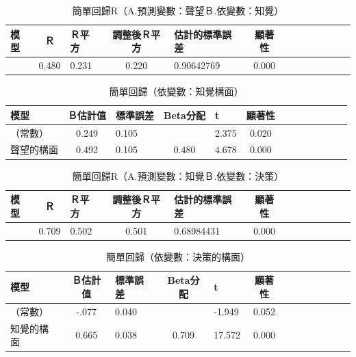 \begin{table}[htb]
\caption{簡單回歸R（A.預測變數：聲望Ｂ.依變數：知覺）}
\label{tab:HR2}
\centering
\renewcommand{\arraystretch}{1.2} %
\arrayrulewidth=1pt               %
\tabcolsep=10pt                   %
\begin{tabular}[t]{lclclclclclcl}  %
\hline
 模型&Ｒ&Ｒ平方&調整後Ｒ平方&估計的標準誤差&顯著性\\
\hline
&0.480&0.231&0.220&0.90642769&0.000\\
\hline
\end{tabular}
\end{table}

\begin{table}[htb]
\caption{簡單回歸（依變數：知覺構面）}
\label{tab:H2}
\centering
\renewcommand{\arraystretch}{1.2} %
\arrayrulewidth=1pt               %
\tabcolsep=10pt                   %
\begin{tabular}[t]{lclclclclclcl}  %
\hline
 模型&Ｂ估計值&標準誤差&Beta分配&t&顯著性\\
\hline
（常數）&0.249&0.105&&2.375&0.020\\
聲望的構面&0.492&0.105&0.480&4.678&0.000\\
\hline
\end{tabular}
\end{table}


\begin{table}[htb]
\caption{簡單回歸R（A.預測變數：知覺Ｂ.依變數：決策）}
\label{tab:HR3}
\centering
\renewcommand{\arraystretch}{1.2} %
\arrayrulewidth=1pt               %
\tabcolsep=10pt                   %
\begin{tabular}[t]{lclclclclclcl}  %
\hline
 模型&Ｒ&Ｒ平方&調整後Ｒ平方&估計的標準誤差&顯著性\\
\hline
&0.709&0.502&0.501&0.68984431&0.000\\
\hline
\end{tabular}
\end{table}


\begin{table}[htb]
\caption{簡單回歸（依變數：決策的構面）}
\label{tab:H3}
\centering
\renewcommand{\arraystretch}{1.2} %
\arrayrulewidth=1pt               %
\tabcolsep=10pt                   %
\begin{tabular}[t]{lclclclclclcl}  %
\hline
 模型&Ｂ估計值&標準誤差&Beta分配&t&顯著性\\
\hline
（常數）&-.077&0.040& &-1.949&0.052\\
知覺的構面&0.665&0.038&0.709&17.572&0.000\\
\hline
\end{tabular}
\end{table}

